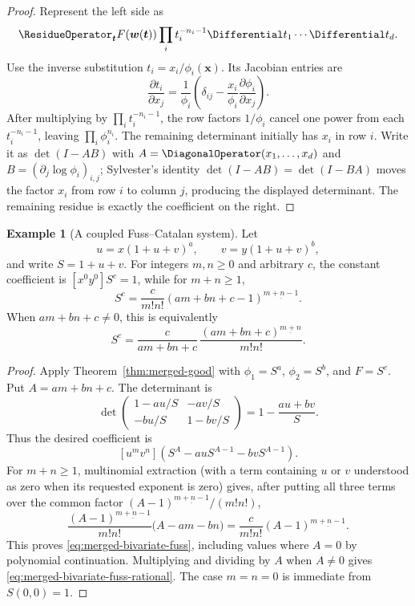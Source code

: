 \documentclass[11pt,a4paper,oneside,openany]{book}
\theoremstyle{definition}
\newtheorem{example}[theorem]{Example}
\theoremstyle{remark}
\begin{document}
\begin{proof}
Represent the left side as
\[
 \ResidueOperator_{\bm t}F(\bm w(\bm t))
 \prod_i t_i^{-n_i-1}\Differential t_1\cdots\Differential t_d.
\]
Use the inverse substitution $t_i=x_i/\phi_i(\bm x)$.  Its Jacobian entries are
\[
 \frac{\partial t_i}{\partial x_j}
 =\frac1{\phi_i}\left(\delta_{ij}-
   \frac{x_i}{\phi_i}\frac{\partial\phi_i}{\partial x_j}\right).
\]
After multiplying by $\prod_i t_i^{-n_i-1}$, the row factors
$1/\phi_i$ cancel one power from each $t_i^{-n_i-1}$, leaving
$\prod_i\phi_i^{n_i}$.  The remaining determinant initially has $x_i$ in row
$i$.  Write it as $\det(I-AB)$ with
$A=\DiagonalOperator(x_1,\ldots,x_d)$ and
$B=(\partial_j\log\phi_i)_{i,j}$; Sylvester's identity
$\det(I-AB)=\det(I-BA)$ moves the factor $x_i$ from row $i$ to
column $j$, producing the
displayed determinant.  The remaining residue is exactly the coefficient on
the right.
\end{proof}

\begin{example}[A coupled Fuss--Catalan system]
Let
\[
 u=x(1+u+v)^a,\qquad v=y(1+u+v)^b,
\]
and write $S=1+u+v$.  For integers $m,n\geq0$ and arbitrary $c$, the
constant coefficient is $[x^0y^0]S^c=1$, while for $m+n\geq1$,
\begin{equation}
 [x^my^n]S^c
 =\frac{c}{m!n!}(am+bn+c-1)^{\underline{m+n-1}}.                    \label{eq:merged-bivariate-fuss}
\end{equation}
When $am+bn+c\ne0$, this is equivalently
\begin{equation}
 [x^my^n]S^c
 =\frac{c}{am+bn+c}\,
   \frac{(am+bn+c)^{\underline{m+n}}}{m!n!}.                        \label{eq:merged-bivariate-fuss-rational}
\end{equation}
\end{example}

\begin{proof}
Apply Theorem~\ref{thm:merged-good} with
$\phi_1=S^a$, $\phi_2=S^b$, and $F=S^c$.  Put $A=am+bn+c$.  The determinant is
\[
 \det\begin{pmatrix}
 1-au/S&-av/S\\-bu/S&1-bv/S
 \end{pmatrix}=1-\frac{au+bv}{S}.
\]
Thus the desired coefficient is
\[
 [u^mv^n]\left(S^A-a uS^{A-1}-b vS^{A-1}\right).
\]
For $m+n\geq1$, multinomial extraction (with a term containing $u$ or
$v$ understood as zero when its requested exponent is zero) gives, after
putting all three terms over the common factor
$(A-1)^{\underline{m+n-1}}/(m!n!)$,
\[
 \frac{(A-1)^{\underline{m+n-1}}}{m!n!}
 \bigl(A-am-bn\bigr)
 =\frac{c}{m!n!}(A-1)^{\underline{m+n-1}}.
\]
This proves \eqref{eq:merged-bivariate-fuss}, including values where $A=0$ by
polynomial continuation.  Multiplying and dividing by $A$
when $A\ne0$ gives \eqref{eq:merged-bivariate-fuss-rational}.  The case
$m=n=0$ is immediate from $S(0,0)=1$.
\end{proof}
\end{document}
